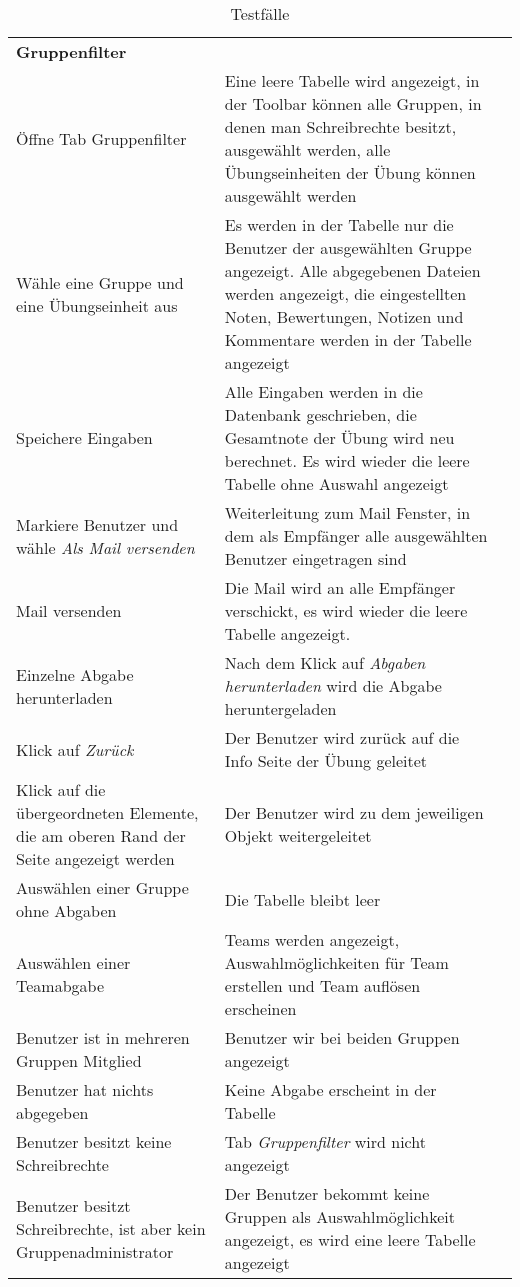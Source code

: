 \begin{table}[]
	\centering
	\caption{Testfälle}
	\label{table4}
	\begin{tabular}{p{6cm}p{7cm}p{3cm}}
			\textbf{Gruppenfilter}  &   &   \\
		    Öffne Tab Gruppenfilter	& Eine leere Tabelle wird angezeigt, in der Toolbar können alle Gruppen, in denen man Schreibrechte besitzt, ausgewählt werden, alle Übungseinheiten der Übung können ausgewählt werden &\checkmark \\
			Wähle eine Gruppe und eine Übungseinheit aus & Es werden in der Tabelle nur die Benutzer der ausgewählten Gruppe angezeigt. Alle abgegebenen Dateien werden angezeigt, die eingestellten Noten, Bewertungen, Notizen und Kommentare werden in der Tabelle angezeigt &\checkmark \\
			Speichere Eingaben & Alle Eingaben werden in die Datenbank geschrieben, die Gesamtnote der Übung wird neu berechnet. Es wird wieder die leere Tabelle ohne Auswahl angezeigt &\checkmark \\
			Markiere Benutzer und wähle \textit{Als Mail versenden}& Weiterleitung zum Mail Fenster, in dem als Empfänger alle ausgewählten Benutzer eingetragen sind  &\checkmark \\
			Mail versenden & Die Mail wird an alle Empfänger verschickt, es wird wieder die leere Tabelle angezeigt. &\checkmark \\
			Einzelne Abgabe herunterladen & Nach dem Klick auf \textit{Abgaben herunterladen} wird die Abgabe heruntergeladen &\checkmark \\
			Klick auf \textit{Zurück} & Der Benutzer wird zurück auf die Info Seite der Übung geleitet &\checkmark \\
			Klick auf die übergeordneten Elemente, die am oberen Rand der Seite angezeigt werden & Der Benutzer wird zu dem jeweiligen Objekt weitergeleitet &\checkmark \\
			Auswählen einer Gruppe ohne Abgaben & Die Tabelle bleibt leer  & \checkmark  \\
			Auswählen einer Teamabgabe 	& Teams werden angezeigt, Auswahlmöglichkeiten für Team erstellen und Team auflösen erscheinen  & \checkmark  \\
			Benutzer ist in mehreren Gruppen Mitglied & Benutzer wir bei beiden Gruppen angezeigt  & \checkmark  \\
			Benutzer hat nichts abgegeben &  Keine Abgabe erscheint in der Tabelle & \checkmark  \\
			Benutzer besitzt keine Schreibrechte & Tab \textit{Gruppenfilter} wird nicht angezeigt  & \checkmark  \\
			Benutzer besitzt Schreibrechte, ist aber kein Gruppenadministrator & Der Benutzer bekommt keine Gruppen als Auswahlmöglichkeit angezeigt, es wird eine leere Tabelle angezeigt  & \checkmark  \\
			
			

	\end{tabular}
\end{table}

